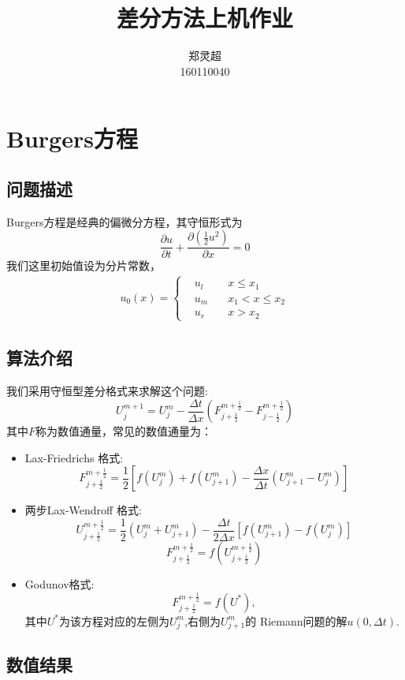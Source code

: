 \documentclass[a4paper,  11pt]{ctexart}
\newcommand\pd[2]{\dfrac{\partial {#1}}{\partial {#2}}}
\begin{document}
\title{差分方法上机作业}
\author{郑灵超\\
160110040
}  
\maketitle
\section{Burgers方程}
\subsection{问题描述}
Burgers方程是经典的偏微分方程，其守恒形式为
\begin{equation}
  \label{eq:Burgers}
  \pd{u}{t}+\pd{(\frac 12u^2)}{x}=0
\end{equation}
我们这里初始值设为分片常数，
\begin{align}
  u_0(x)=\left\{
  \begin{aligned}
    &u_l \quad & x \leq x_1 \\
    &u_m \quad & x_1<x\leq x_2 \\
    &u_r \quad & x > x_2
  \end{aligned}
  \right.
\end{align}
\subsection{算法介绍}
我们采用守恒型差分格式来求解这个问题:
\[
U_{j}^{m+1}=U_j^m - \frac{\Delta t}{\Delta x}(F_{j+\frac 12}^{m+\frac
12}-F_{j-\frac 12}^{m+\frac 12})
\]
其中$F$称为数值通量，常见的数值通量为：
\begin{itemize}
  \item Lax-Friedrichs 格式:
    \[  
       F_{j+\frac 12}^{m+\frac 12} = \frac 12\left[
       f(U_{j}^m)+f(U_{j+1}^m)-\frac{\Delta x}{\Delta t}(U_{j+1}^m-U_j^m)\right]
    \]
  \item 两步Lax-Wendroff 格式:
    \[ 
      U_{j+\frac 12}^{m+\frac 12}=\frac
      12(U_j^m+U_{j+1}^m)-\frac{\Delta t}{2\Delta
      x}[f(U_{j+1}^m)-f(U_j^m)]
    \]
    \[
      F_{j+\frac 12}^{m+\frac 12}=f(U_{j+\frac 12}^{m+\frac 12})
    \]
  \item Godunov格式:
    \[  
       F_{j+\frac 12}^{m+\frac 12}=f(U^*),
    \]
    其中$U^*$为该方程对应的左侧为$U_j^m$,右侧为$U_{j+1}^m$的
    Riemann问题的解$u(0,\Delta t)$.
\end{itemize}
\subsection{数值结果}
\end{document}
